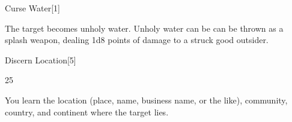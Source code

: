 \begin{spellsection}{Curse Water}[1]
\begin{spellcontent}
\begin{spelltargetinginfo}
\end{spelltargetinginfo}
\begin{spelleffects}
\spelleffect
The target becomes unholy water.
Unholy water can be can be thrown as a splash weapon, dealing 1d8 points of damage to a struck good outsider.
\end{spelleffects}
\end{spellcontent}
\begin{spellfooter}
\end{spellfooter}
\begin{spellsubcontent}
\end{spellsubcontent}
\end{spellsection}
\begin{spellsection}{Discern Location}[5]
\begin{spellcontent}
\begin{spelltargetinginfo}
 25
\end{spelltargetinginfo}
\begin{spelleffects}
\spelleffect
You learn the location (place, name, business name, or the like), community, country, and continent where the target lies.
\end{spelleffects}
\end{spellcontent}
\begin{spellfooter}
\end{spellfooter}
\begin{spellsubcontent}
\end{spellsubcontent}
\end{spellsection}
